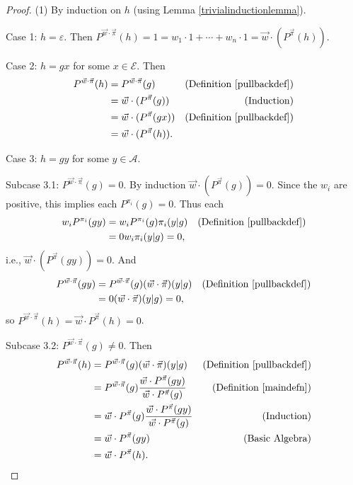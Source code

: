\documentclass[twoside]{article}
\begin{document}
\begin{proof}
    (1) By induction on $h$ (using Lemma \ref{trivialinductionlemma}).

    Case 1: $h=\varepsilon$. Then
    $P^{\vec w\cdot\vec\pi}(h)=1=w_1\cdot 1+\cdots+w_n\cdot 1
    =\vec w\cdot ({P^{\vec\pi}}(h))$.

    Case 2: $h=gx$ for some $x\in\mathcal E$. Then
    \begin{align*}
        P^{\vec w\cdot\vec\pi}(h)
            &= P^{\vec w\cdot\vec\pi}(g)
                &\mbox{(Definition \ref{pullbackdef})}\\
            &= \vec w\cdot({P^{\vec\pi}}(g))
                &\mbox{(Induction)}\\
            &= \vec w\cdot({P^{\vec\pi}}(gx))
                &\mbox{(Definition \ref{pullbackdef})}\\
            &= \vec w\cdot({P^{\vec\pi}}(h)).
    \end{align*}

    Case 3: $h=gy$ for some $y\in\mathcal A$.

    Subcase 3.1: $P^{\vec w\cdot\vec\pi}(g)=0$.
        By induction $\vec w\cdot({P^{\vec\pi}}(g))=0$.
        Since the $w_i$ are positive, this implies
        each $P^{\pi_i}(g)=0$.
        Thus each
        \begin{align*}
            w_i P^{\pi_i}(gy)
                &= w_i P^{\pi_i}(g)\pi_i(y|g)
                    &\mbox{(Definition \ref{pullbackdef})}\\
                &= 0w_i\pi_i(y|g)=0,
        \end{align*}
        i.e., $\vec w\cdot({P^{\vec\pi}}(gy))=0$.
        And
        \begin{align*}
            P^{\vec w\cdot\vec\pi}(gy)
                &= P^{\vec w\cdot\vec\pi}(g)(\vec w\cdot\vec\pi)(y|g)
                    &\mbox{(Definition \ref{pullbackdef})}\\
                &= 0(\vec w\cdot\vec\pi)(y|g) = 0,
        \end{align*}
        so $P^{\vec w\cdot\vec\pi}(h)=\vec w\cdot P^{\vec\pi}(h)=0$.

    Subcase 3.2: ${P^{\vec w\cdot\vec\pi}}(g)\not=0$. Then
    \begin{align*}
        P^{\vec w\cdot\vec\pi}(h)
            &= P^{\vec w\cdot\vec\pi}(g)(\vec w\cdot\vec\pi)(y|g)
                &\mbox{(Definition \ref{pullbackdef})}\\
            &= P^{\vec w\cdot\vec\pi}(g)
                \frac
                {\vec w\cdot {P^{\vec\pi}}(gy)}
                {\vec w\cdot {P^{\vec\pi}}(g)}
                &\mbox{(Definition \ref{maindefn})}\\
            &= \vec w\cdot {P^{\vec\pi}}(g)
                \frac
                {\vec w\cdot {P^{\vec\pi}}(gy)}
                {\vec w\cdot {P^{\vec\pi}}(g)}
                &\mbox{(Induction)}\\
            &= \vec w\cdot {P^{\vec\pi}}(gy)
                &\mbox{(Basic Algebra)}\\
            &= \vec w\cdot {P^{\vec\pi}}(h).
    \end{align*}


\end{proof}
\end{document}
